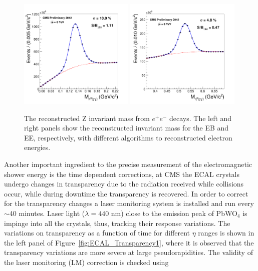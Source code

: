 \begin{figure}
 \centering
\includegraphics[width=0.49\textwidth]{CMS_DetectorFigures/EB_2012_pi0.png}
\includegraphics[width=0.49\textwidth]{CMS_DetectorFigures/EB_2012_eta0.png}
\caption{The reconstructed Z invariant mass from $e^{+}e^{-}$
  decays. The left and right panels show the reconstructed invariant mass for
  the EB and EE, respectively, with different algorithms to reconstructed electron energies.\label{fig:ECAL_pizero}}
\end{figure}
Another important ingredient to the precise measurement of the
electromagnetic shower energy is the time dependent corrections, at
CMS the ECAL crystals undergo changes in transparency due to the
radiation received while collisions occur, while  during downtime the
transparency is recovered. In order to correct for the transparency
changes a laser monitoring system is installed and run every $\sim$40
minutes. Laser light ($\lambda = 440$ nm) close to the emission peak of PbWO$_{4}$
is impinge into all the crystals, thus, tracking their response
variations. The variations on transparency as a function of time for
different $\eta$ ranges is shown in
the left panel of Figure~\ref{fig:ECAL_Transparency1}, where it is observed that the
transparency variations are more severe at large pseudorapidities. The
validity of the laser monitoring (LM) correction is checked using
